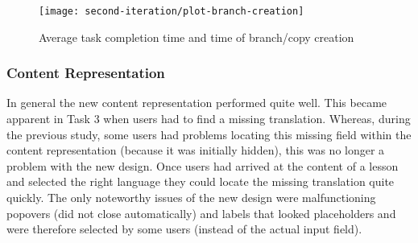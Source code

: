 \begin{figure}[h!]
 \centering
 \texttt{[image: second-iteration/plot-branch-creation]}
 \caption{Average task completion time and time of branch/copy creation}
 \label{fig:avg-time-task1}
\end{figure}

\subsubsection{Content Representation}
In general the new content representation performed quite well. This became apparent in Task 3 when users had to find a missing translation. Whereas, during the previous study, some users had problems locating this missing field within the content representation (because it was initially hidden), this was no longer a problem with the new design. Once users had arrived at the content of a lesson and selected the right language they could locate the missing translation quite quickly. The only noteworthy issues of the new design were malfunctioning popovers (did not close automatically) and labels that looked placeholders and were therefore selected by some users (instead of the actual input field).





